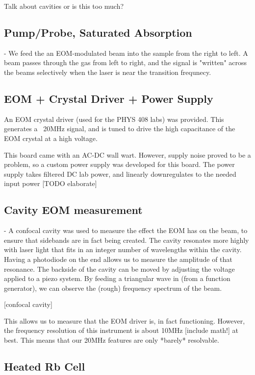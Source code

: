 Talk about cavities or is this too much?
 
\subsection{Pump/Probe, Saturated Absorption}

- We feed the an EOM-modulated beam into the sample from the right to left.  A beam passes through the gas from left to right, and the signal is "written" across the beams selectively when the laser is near the transition frequnecy.

\subsection{EOM + Crystal Driver + Power Supply}

An EOM crystal driver (used for the PHYS 408 labs) was provided.  This generates a ~20MHz signal, and is tuned to drive the high capacitance of the EOM crystal at a high voltage.

This board came with an AC-DC wall wart.  However, supply noise proved to be a problem, so a custom power supply was developed for this board.  The power supply takes filtered DC lab power, and linearly downregulates to the needed input power [TODO elaborate]

\subsection{Cavity EOM measurement}

- A confocal cavity was used to measure the effect the EOM has on the beam, to ensure that sidebands are in fact being created.  The cavity resonates more highly with laser light that fits in an integer number of wavelengths within the cavity.  Having a photodiode on the end allows us to measure the amplitude of that resonance.  The backside of the cavity can be moved by adjusting the voltage applied to a piezo system.  By feeding a triangular wave in (from a function generator), we can observe the (rough) frequency spectrum of the beam.

[confocal cavity]

This allows us to measure that the EOM driver is, in fact functioning.  However, the frequency resolution of this instrument is about 10MHz [include math!] at best.  This means that our 20MHz features are only *barely* resolvable.

\subsection{Heated Rb Cell}

